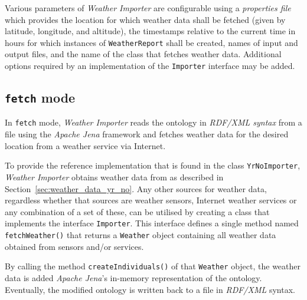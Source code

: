 Various parameters of \emph{Weather Importer} are configurable using a \emph{properties file}~\cite{java_properties} which provides the location for which weather data shall be fetched (given by latitude, longitude, and altitude), the timestamps relative to the current time in hours for which instances of \texttt{WeatherReport} shall be created, names of input and output files, and the name of the class that fetches weather data. Additional options required by an implementation of the \texttt{Importer} interface may be added.

\subsection{\texttt{fetch} mode}
\label{subsec:importer_fetch}

In \texttt{fetch} mode, \emph{Weather Importer} reads the \smarthomeweather ontology in \emph{RDF/XML syntax} from a file using the \emph{Apache Jena} framework and fetches weather data for the desired location from a weather service via Internet.

To provide the reference implementation that is found in the class \texttt{YrNoImporter}, \emph{Weather Importer} obtains weather data from \yrno as described in Section~\ref{sec:weather_data_yr_no}. Any other sources for weather data, regardless whether that sources are weather sensors, Internet weather services or any combination of a set of these, can be utilised by creating a class that implements the interface \texttt{Importer}. This interface defines a single method named \texttt{fetchWeather()} that returns a \texttt{Weather} object containing all weather data obtained from sensors and/or services.

By calling the method \texttt{createIndividuals()} of that \texttt{Weather} object, the weather data is added \emph{Apache Jena}'s in-memory representation of the ontology. Eventually, the modified ontology is written back to a file in \emph{RDF/XML} syntax.

